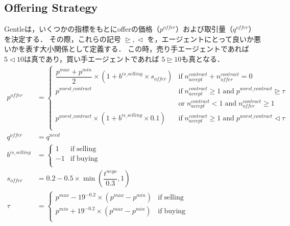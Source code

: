 \documentclass[uplatex, 10pt, a4j]{jsarticle}
\begin{document}
\subsection{\textrm{Offering Strategy}}
Gentleは，いくつかの指標をもとにofferの価格（$p^{offer}$）および取引量（$q^{offer}$）を決定する．
その際，これらの記号 $\trianglerighteq, \vartriangleleft$ を，エージェントにとって良いか悪いかを表す大小関係として定義する．
この時，売り手エージェントであれば $5\vartriangleleft 10$は真であり，買い手エージェントであれば $5 \trianglerighteq 10$も真となる．
\begin{equation*}
    \begin{split}
        p^{offer}&=\left\{\begin{array}{ll}
            \dfrac{p^{max}+p^{min}}{2} \times \left(1+b^{is\_selling}\times s_{offer}\right) & \mathrm{if} \; n^{contract}_{accept}+n^{contract}_{offer}=0                                               \\ [3mm]
            p^{worst\_contract}                                                              & \mathrm{if} \; n^{contract}_{accept} \geq 1 \; \mathrm{and} \; p^{worst\_contract} \trianglerighteq  \tau \\ [1mm]
                                                                                             & \mathrm{or} \; n^{contract}_{accept}<1 \; \mathrm{and} \; n^{contract}_{offer} \geq 1                     \\ [3mm]
            p^{worst\_contract} \times \left(1 + b^{is\_selling} \times 0.1\right)           & \mathrm{if} \; n^{contract}_{accept} \geq 1 \; \mathrm{and} \; p^{worst\_contract} \vartriangleleft \tau  \\
        \end{array}\right. \\
        q^{offer} &= q^{need} \\
        b^{is\_selling}&=\left\{\begin{array}{ll}
            1  & \mathrm{if \; selling} \\
            -1 & \mathrm{if \; buying}  \\
        \end{array}\right. \\
        s_{offer} &= 0.2-0.5 \times \min{\left(\dfrac{t^{nego}}{0.3}, 1\right)} \\
        \tau &= \left\{\begin{array}{ll}
            p^{max} - 19^{-0.2} \times \left(p^{max} - p^{min}\right) & \mathrm{if \; selling} \\
            p^{min} + 19^{-0.2} \times \left(p^{max} - p^{min}\right) & \mathrm{if \; buying}  \\
        \end{array}\right. \\
    \end{split}
\end{equation*}
\end{document}
